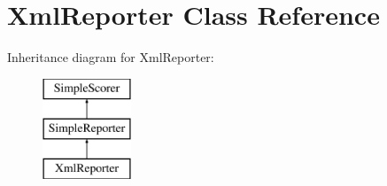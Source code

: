 \hypertarget{class_xml_reporter}{
\section{XmlReporter Class Reference}
\label{class_xml_reporter}
}
Inheritance diagram for XmlReporter:\begin{figure}[H]
\begin{center}
\leavevmode
\includegraphics[height=3.000000cm]{class_xml_reporter}
\end{center}
\end{figure}
